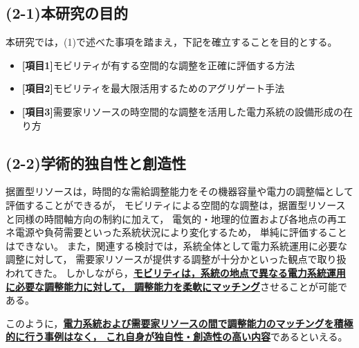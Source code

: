 \documentclass[11pt,a4paper,uplatex,dvipdfmx]{ujarticle} 		%
\newcommand{\研究課題名}{モビリティの時空間調整を活用した電力設備形成構築}
\newcommand{\研究機関名}{名古屋工業大学}
\newcommand{\研究代表者氏名}{中村勇太}
\newcommand{\研究期間の最終元号年度}{10}  %
\begin{document}
\subsection*{(2-1)本研究の目的}
\vspace{-0.5\baselineskip}           %

本研究では，(1)で述べた事項を踏まえ，下記を確立することを目的とする。
\begin{itemize}
	\item \textbf{[項目1]}モビリティが有する空間的な調整を正確に評価する方法
	\item \textbf{[項目2]}モビリティを最大限活用するためのアグリゲート手法
	\item \textbf{[項目3]}需要家リソースの時空間的な調整を活用した電力系統の設備形成の在り方
\end{itemize}


\vspace{-1.5\baselineskip}           %
\subsection*{(2-2)学術的独自性と創造性}
\vspace{-0.5\baselineskip}           %

据置型リソースは，時間的な需給調整能力をその機器容量や電力の調整幅として評価することができるが，
モビリティによる空間的な調整は，据置型リソースと同様の時間軸方向の制約に加えて，
電気的・地理的位置および各地点の再エネ電源や負荷需要といった系統状況により変化するため，
単純に評価することはできない。
また，関連する検討では，系統全体として電力系統運用に必要な調整に対して，
需要家リソースが提供する調整が十分かといった観点で取り扱われてきた。
しかしながら，\textbf{\ul{モビリティは，系統の地点で異なる電力系統運用に必要な調整能力に対して，
調整能力を柔軟にマッチング}}させることが可能である。

このように，\textbf{\ul{電力系統および需要家リソースの間で調整能力のマッチングを積極的に行う事例はなく，
これ自身が独自性・創造性の高い内容}}であるといえる。
\end{document}
